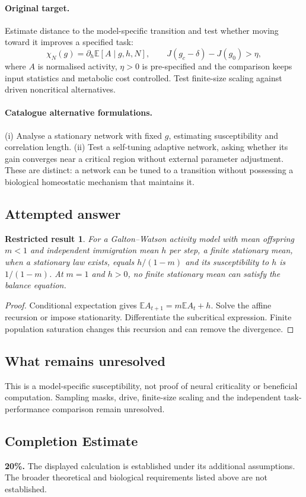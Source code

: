\documentclass[11pt]{article}
\newcommand{\E}{\mathbb E}
\providecommand{\E}{\mathbb E}
\newtheorem{attemptresult}{Restricted result}[section]
\begin{document}
\paragraph{Original target.}
Estimate distance to the model-specific transition and test whether moving toward it improves a specified task:
\[
\chi_N(g)=\partial_h\E[A\mid g,h,N],\qquad
J(g_c-\delta)-J(g_0)>\eta,
\]
where $A$ is normalised activity, $\eta>0$ is pre-specified and the comparison keeps input statistics and metabolic cost controlled. Test finite-size scaling against driven noncritical alternatives.
\paragraph{Catalogue alternative formulations.}
(i) Analyse a stationary network with fixed $g$, estimating susceptibility and correlation length. (ii) Test a self-tuning adaptive network, asking whether its gain converges near a critical region without external parameter adjustment. These are distinct: a network can be tuned to a transition without possessing a biological homeostatic mechanism that maintains it.
\subsection{Attempted answer}
\begin{attemptresult}
For a Galton--Watson activity model with mean offspring $m<1$ and independent immigration mean $h$ per step, a finite stationary mean, when a stationary law exists, equals $h/(1-m)$ and its susceptibility to $h$ is $1/(1-m)$. At $m=1$ and $h>0$, no finite stationary mean can satisfy the balance equation.
\end{attemptresult}
\begin{proof}
Conditional expectation gives $\E A_{t+1}=m\E A_t+h$. Solve the affine recursion or impose stationarity. Differentiate the subcritical expression. Finite population saturation changes this recursion and can remove the divergence.
\end{proof}
\subsection{What remains unresolved}
This is a model-specific susceptibility, not proof of neural criticality or beneficial computation. Sampling masks, drive, finite-size scaling and the independent task-performance comparison remain unresolved.
\subsection{Completion Estimate}
\textbf{20\%.} The displayed calculation is established under its additional assumptions. The broader theoretical and biological requirements listed above are not established.
\end{document}
